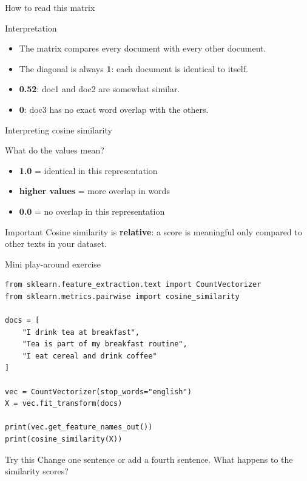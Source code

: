 \documentclass[compress]{beamer}
\begin{document}
\begin{frame}{How to read this matrix}
  \begin{block}{Interpretation}
    \begin{itemize}[<+>]
      \item The matrix compares every document with every other document.
      \item The diagonal is always \textbf{1}: each document is identical to itself.
      \item \textbf{0.52}: doc1 and doc2 are somewhat similar.
      \item \textbf{0}: doc3 has no exact word overlap with the others.
    \end{itemize}
  \end{block}
\end{frame}

\begin{frame}{Interpreting cosine similarity}
  \begin{block}{What do the values mean?}
    \begin{itemize}[<+>]
      \item \textbf{1.0} = identical in this representation
      \item \textbf{higher values} = more overlap in words
      \item \textbf{0.0} = no overlap in this representation
    \end{itemize}
  \end{block}
  \pause
  \begin{alertblock}{Important}
    Cosine similarity is \textbf{relative}: a score is meaningful only compared to other texts in your dataset.
  \end{alertblock}
\end{frame}

\begin{frame}[fragile]{Mini play-around exercise}
\begin{verbatim}
from sklearn.feature_extraction.text import CountVectorizer
from sklearn.metrics.pairwise import cosine_similarity

docs = [
    "I drink tea at breakfast",
    "Tea is part of my breakfast routine",
    "I eat cereal and drink coffee"
]

vec = CountVectorizer(stop_words="english")
X = vec.fit_transform(docs)

print(vec.get_feature_names_out())
print(cosine_similarity(X))
\end{verbatim}

\pause

\begin{alertblock}{Try this}
Change one sentence or add a fourth sentence. What happens to the similarity scores?
\end{alertblock}
\end{frame}
\end{document}
